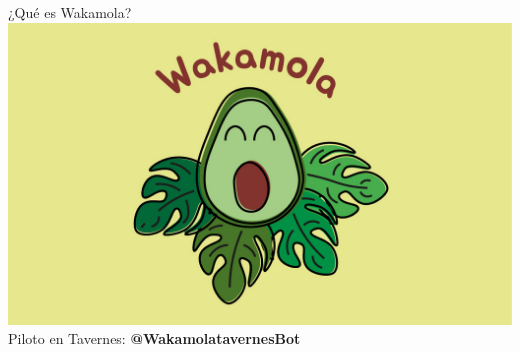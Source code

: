 \documentclass[bigger]{beamer}
\begin{document}
\begin{frame}{¿Qué es Wakamola?}
	\centering
	\includegraphics[scale=0.95]{img/wakamola_logo}\\
	Piloto en Tavernes:\textbf{ @WakamolatavernesBot}
\end{frame}
\end{document}
